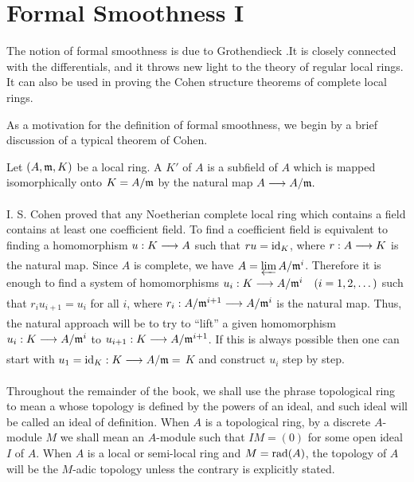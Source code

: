 \documentclass[../main]{subfiles}
\begin{document}
\section{Formal Smoothness I}\label{sec:28}

\newparagraph The notion of formal smoothness is due to Grothendieck \cite{egaIV}.It is closely connected with the differentials, and it throws new light to the theory of regular local rings. It can also be used in proving the Cohen structure theorems of complete local rings.

As a motivation for the definition of formal smoothness, we begin by a brief discussion of a typical theorem of Cohen.
\begin{definition}
Let $(A, \mathfrak{m}, K)$ be a local ring. A  $K'$ of $A$ is a subfield of $A$ which is mapped isomorphically onto $K=A / \mathfrak{m}$ by the natural map \newline $A \varrightarrow{} A/\ideal{m} .$
\end{definition}

I. S. Cohen proved that any Noetherian complete local ring which contains a field contains at least one coefficient field. To find a coefficient field is equivalent to finding a homomorphism $u: K \varrightarrow{} A$ such that $r u=\operatorname{id}_K$, where $r: A \varrightarrow{} K$ is the natural map. Since $A$ is complete, we have $A=\varprojlim A/\mathfrak{m}^i$. Therefore it is enough to find a system of homomorphisms $u_i: K \varrightarrow{} A/\ideal{m}^i\for{i=1,2, \ldots}$ such that $r_i u_{i+1}=u_i$ for all $i$, where $r_i: A / \ideal{m}^{i+1} \varrightarrow{} A / \ideal{m}^i$ is the natural map. Thus, the natural approach will be to try to ``lift'' a given homomorphism $u_i: K \varrightarrow{} A/\ideal{m}^i$ to $u_{i+1}: K \varrightarrow{} A/\ideal{m}^{i+1}$. If this is always possible then one can start with $u_1=\id_K: K \varrightarrow{} A/\ideal{m}=$ $K$ and construct $u_i$ step by step.

\begin{parconvention}
Throughout the remainder of the book, we shall use the phrase topological ring to mean a  whose topology is defined by the powers of an ideal, and such ideal will be called an ideal of definition. When $A$ is a topological ring, by a discrete $A$-module $M$ we shall mean an $A$-module such that $I M=(0)$ for some open ideal $I$ of $A$. When $A$ is a local or semi-local ring and $M=\operatorname{rad}(A)$, the topology of $A$ will be the $M$-adic topology unless the contrary is explicitly stated.
\end{parconvention} 
\end{document}
